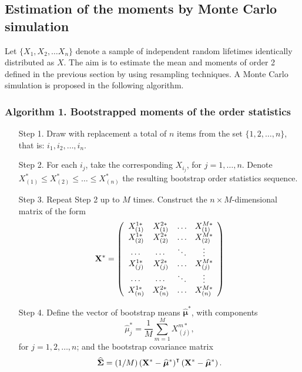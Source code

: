 \documentclass[preprint,12pt]{elsarticle}
\begin{document}



\subsection{Estimation of the moments by Monte Carlo simulation}

Let $\{X_1, X_2, \ldots  X_n\}$ denote a sample of independent random lifetimes identically distributed as $X$. The aim is to estimate the mean and moments of order 2 defined in the previous section by using resampling techniques. A Monte Carlo simulation is proposed in the following algorithm. 
\subsubsection*{Algorithm 1. Bootstrapped moments of the order statistics}
\begin{enumerate}
\item[Step 1.] Draw with replacement a total of $n$ items from the set $\{1,2, \ldots, n\}$, that is: $i_1,i_2, \ldots, i_n$.
\item[Step 2.] For each $i_j$, take the corresponding $X_{i_j}$, for $j=1,\ldots, n$. Denote $X^*_{(1)} \leq X^*_{(2)}\leq  \ldots \leq X^*_{(n)}$ the resulting bootstrap order statistics sequence.  
\item[Step 3.] Repeat Step 2 up to $M$ times. Construct the $n \times M$-dimensional matrix of the form
$${\bf X}^*=\left(\begin{array} {cccc}
                     X^{1*}_{(1)} & X^{2*}_{(1)}&  \ldots & X^{M*}_{(1)} \\
                     X^{1*}_{(2)} & X^{2*}_{(2)}&  \ldots & X^{M*}_{(2)} \\
										 \cdots    & \cdots   &  \ddots  & \vdots    \\
										 X^{1*}_{(j)} & X^{2*}_{(j)}&  \ldots & X^{M*}_{(j)} \\
										 \cdots    & \cdots   &  \ddots  & \vdots    \\
										 X^{1*}_{(n)} & X^{2*}_{(n)}&  \ldots & X^{M*}_{(n)} \\
              \end{array}\right)$$
\item[Step 4.] Define the vector of bootstrap means $\widehat{\boldsymbol \mu}^*$, with components 
$$\widehat{ \mu}_j^*=\frac{1}{M}\sum_{m=1}^M X_{(j)}^{m*},$$
 for $j=1,2, \ldots, n$; and the bootstrap covariance matrix  
$$\widehat{\boldsymbol \Sigma}=(1/M)\left({\bf X}^*-\widehat{\boldsymbol \mu}^*\right)^{\intercal}\left({\bf X}^*-\widehat{\boldsymbol \mu}^*\right).$$
\end{enumerate}
\end{document}
